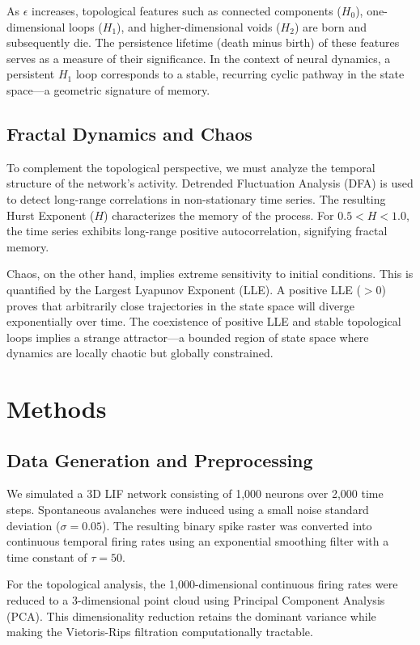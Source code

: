 \documentclass[11pt,a4paper]{article}
\begin{document}
As $\epsilon$ increases, topological features such as connected components ($H_0$), one-dimensional loops ($H_1$), and higher-dimensional voids ($H_2$) are born and subsequently die. The persistence lifetime (death minus birth) of these features serves as a measure of their significance. In the context of neural dynamics, a persistent $H_1$ loop corresponds to a stable, recurring cyclic pathway in the state space---a geometric signature of memory.

\subsection{Fractal Dynamics and Chaos}
To complement the topological perspective, we must analyze the temporal structure of the network's activity. Detrended Fluctuation Analysis (DFA) is used to detect long-range correlations in non-stationary time series. The resulting Hurst Exponent ($H$) characterizes the memory of the process. For $0.5 < H < 1.0$, the time series exhibits long-range positive autocorrelation, signifying fractal memory.

Chaos, on the other hand, implies extreme sensitivity to initial conditions. This is quantified by the Largest Lyapunov Exponent (LLE). A positive LLE ($> 0$) proves that arbitrarily close trajectories in the state space will diverge exponentially over time. The coexistence of positive LLE and stable topological loops implies a strange attractor---a bounded region of state space where dynamics are locally chaotic but globally constrained.

\section{Methods}

\subsection{Data Generation and Preprocessing}
We simulated a 3D LIF network consisting of 1,000 neurons over 2,000 time steps. Spontaneous avalanches were induced using a small noise standard deviation ($\sigma = 0.05$). The resulting binary spike raster was converted into continuous temporal firing rates using an exponential smoothing filter with a time constant of $\tau=50$. 

For the topological analysis, the 1,000-dimensional continuous firing rates were reduced to a 3-dimensional point cloud using Principal Component Analysis (PCA). This dimensionality reduction retains the dominant variance while making the Vietoris-Rips filtration computationally tractable.
\end{document}
